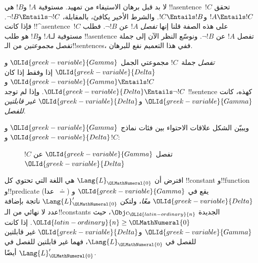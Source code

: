 \documentclass[../../../include/open-logic-section]{subfiles}
\begin{document}


لا بد قبل برهان الاستيفاء من تمهيد. مستوفية
$!A$ و$!B$ هي !!a{sentence}~$!C$ تحقق $!A \Entails !C$
و$!C \Entails !B$. والشرط الأخير يكافئ، بالمقابلة،
$\lnot !B \Entails \lnot !C$. فإذا كانت !!^a{sentence}~$!C$
على هذه الصفة قلنا إنها \emph{تفصل} $!A$ عن $\lnot !B$.
فطلب مستوفية لـ$!A$ و$!B$ هو طلب !!a{sentence}
تفصل $!A$ عن $\lnot !B$. ونوسّع النظر الآن إلى جملة
تفصل \emph{مجموعتين} من الـ!!{sentence}s، ففي هذا
التعميم نفع للبرهان.

\begin{defn}
\emph{تفصل} جملة~$!C$ مجموعتي الجمل $\OLId{greek-variable}{Gamma}$ و$\OLId{greek-variable}{Delta}$ إذا وفقط إذا كان
$\OLId{greek-variable}{Gamma} \Entails !C$ و$\OLId{greek-variable}{Delta} \Entails \lnot !C$. وإذا لم توجد
!!{sentence} كهذه، كانت $\OLId{greek-variable}{Gamma}$ و$\OLId{greek-variable}{Delta}$ \emph{غير قابلتين للفصل}.
\end{defn}

ويبيّن الشكل علاقات الاحتواء بين فئات نماذج $\OLId{greek-variable}{Gamma}$ و$\OLId{greek-variable}{Delta}$ و$!C$:
\begin{figure}[h]
  \centering
  \caption{$!C$ تفصل $\OLId{greek-variable}{Gamma}$ عن $\OLId{greek-variable}{Delta}$}
\end{figure}


\begin{lem}
افترض أن $\Lang{L}_\OLMathNumeral{0}$ هي اللغة التي تحتوي كل !!{constant} و!!{function}
و!!{predicate} (عدا~$\doteq$) يقع في $\OLId{greek-variable}{Gamma}$ و$\OLId{greek-variable}{Delta}$ \emph{معًا}،
ولتكن $\Lang{L}'_\OLMathNumeral{0}$ ناتجة بإضافة عدد لا نهائي من الـ!!{constant}s الجديدة
$\Obj c_\OLId{latin-ordinary}{n}$، حيث $\OLId{latin-ordinary}{n} \ge \OLMathNumeral{0}$. إذا كانت $\OLId{greek-variable}{Gamma}$ و$\OLId{greek-variable}{Delta}$ غير قابلتين
للفصل في $\Lang{L}_\OLMathNumeral{0}$، فهما غير قابلتين للفصل في $\Lang{L}'_\OLMathNumeral{0}$ أيضًا.
\end{lem}
\end{document}
